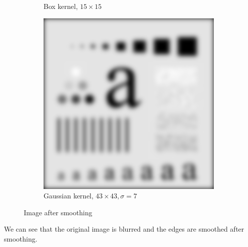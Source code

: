 \documentclass[UTF8]{ctexart}
\begin{document}
\begin{figure}[htbp]
\begin{subfigure}{0.3\textwidth}
        \caption{Box kernel, $15\times15$}
    \end{subfigure}%
    \hfill
    \begin{subfigure}{0.3\textwidth}
        \centering
        \includegraphics[width=\linewidth]{pattern_gauss_smooth.png}
        \caption{Gaussian kernel, $43\times43, \sigma = 7$}
    \end{subfigure}

    \caption{Image after smoothing}
\end{figure}

We can see that the original image is blurred and the edges are smoothed after smoothing.\\
\end{document}
